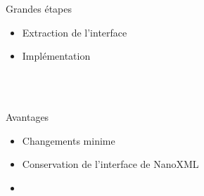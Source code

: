 \begin{frame}
\begin{minipage}[c]{.6\linewidth}
\begin{minipage}[c]{\linewidth}
\begin{beamerboxesrounded}[shadow=true]{Grandes étapes}
\begin{itemize}
	\item Extraction de l'interface
	\item Implémentation
\end{itemize}
\end{beamerboxesrounded}
\end{minipage}
~\\
~\\
\begin{minipage}[c]{\linewidth}
\begin{beamerboxesrounded}[shadow=true]{Avantages}
\begin{itemize}
	\item Changements minime
	\item Conservation de l'interface de NanoXML
	\item 
\end{itemize}
\end{beamerboxesrounded}
\end{minipage}
\end{minipage}
\end{frame}
